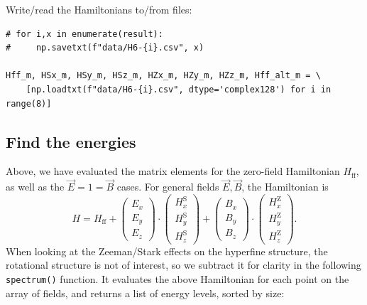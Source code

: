 Write/read the Hamiltonians to/from files:

\begin{lstlisting}
# for i,x in enumerate(result):
#     np.savetxt(f"data/H6-{i}.csv", x)

Hff_m, HSx_m, HSy_m, HSz_m, HZx_m, HZy_m, HZz_m, Hff_alt_m = \
    [np.loadtxt(f"data/H6-{i}.csv", dtype='complex128') for i in range(8)]
\end{lstlisting}

\subsection{Find the energies}

Above, we have evaluated the matrix elements for the zero-field Hamiltonian
$H_\text{ff}$, as well as the $\vec E=1=\vec B$ cases. For general fields $\vec
E,\vec B$, the Hamiltonian is
%
$$
H=H_\text{ff}
+
\begin{pmatrix}
E_x\\E_y\\E_z
\end{pmatrix}
\cdot
\begin{pmatrix}
H^\text{S}_x\\H^\text{S}_y\\H^\text{S}_z
\end{pmatrix}
+
\begin{pmatrix}
B_x\\B_y\\B_z
\end{pmatrix}
\cdot
\begin{pmatrix}
H^\text{Z}_x\\H^\text{Z}_y\\H^\text{Z}_z
\end{pmatrix}.
$$
%
When looking at the Zeeman/Stark effects on the hyperfine structure, the
rotational structure is not of interest, so we subtract it for clarity in the
following \verb`spectrum()` function. It evaluates the above Hamiltonian for
each point on the array of fields, and returns a list of energy levels, sorted
by size:


